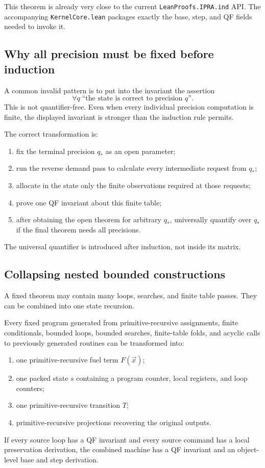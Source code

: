 This theorem is already very close to the current \texttt{LeanProofs.IPRA.ind} API.  The accompanying \texttt{KernelCore.lean} packages exactly the base, step, and QF fields needed to invoke it.

\subsection{Why all precision must be fixed before induction}

A common invalid pattern is to put into the invariant the assertion
\[
  \forall q\; \text{``the state is correct to precision }q\text{''}.
\]
This is not quantifier-free.  Even when every individual precision computation is finite, the displayed invariant is stronger than the induction rule permits.

The correct transformation is:
\begin{enumerate}[label=(\arabic*)]
  \item fix the terminal precision \(q_*\) as an open parameter;
  \item run the reverse demand pass to calculate every intermediate request from \(q_*\);
  \item allocate in the state only the finite observations required at those requests;
  \item prove one QF invariant about this finite table;
  \item after obtaining the open theorem for arbitrary \(q_*\), universally quantify over \(q_*\) if the final theorem needs all precisions.
\end{enumerate}
The universal quantifier is introduced after induction, not inside its matrix.

\subsection{Collapsing nested bounded constructions}

A fixed theorem may contain many loops, searches, and finite table passes.  They can be combined into one state recursion.

\begin{theorem}\label{thm:one-loop}
Every fixed program generated from primitive-recursive assignments, finite conditionals, bounded loops, bounded searches, finite-table folds, and acyclic calls to previously generated routines can be transformed into:
\begin{enumerate}[label=(\roman*)]
  \item one primitive-recursive fuel term \(F(\vec x)\);
  \item one packed state \(s\) containing a program counter, local registers, and loop counters;
  \item one primitive-recursive transition \(T\);
  \item primitive-recursive projections recovering the original outputs.
\end{enumerate}
If every source loop has a QF invariant and every source command has a local preservation derivation, the combined machine has a QF invariant and an object-level base and step derivation.
\end{theorem}

